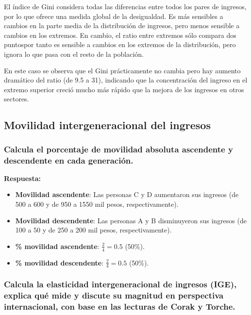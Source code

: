 \documentclass[
]{article}
\begin{document}
El índice de Gini considera todas las diferencias entre todos los pares
de ingresos, por lo que ofrece una medida global de la desigualdad. Es
más sensibles a cambios en la parte media de la distribución de
ingresos, pero menos sensible a cambios en los extremos. En cambio, el
ratio entre extremos sólo compara dos puntospor tanto es sensible a
cambios en los extremos de la distribución, pero ignora lo que pasa con
el resto de la población.

En este caso se observa que el Gini prácticamente no cambia pero hay
aumento dramático del ratio (de 9.5 a 31), indicando que la
concentración del ingreso en el extremo superior creció mucho más rápido
que la mejora de los ingresos en otros sectores.

\subsection{Movilidad intergeneracional del
ingresos}\label{movilidad-intergeneracional-del-ingresos}

\subsubsection{Calcula el porcentaje de movilidad absoluta ascendente y
descendente en cada
generación.}\label{calcula-el-porcentaje-de-movilidad-absoluta-ascendente-y-descendente-en-cada-generaciuxf3n.}

\textbf{Respuesta:}

\begin{itemize}
\item
  \textbf{Movilidad ascendente}: Las personas C y D aumentaron sus
  ingresos (de 500 a 600 y de 950 a 1550 mil pesos, respectivamente).
\item
  \textbf{Movilidad descendente}: Las personas A y B disminuyeron sus
  ingresos (de 100 a 50 y de 250 a 200 mil pesos, respectivamente).
\item
  \textbf{\% movilidad ascendente}: \(\frac{2}{4} = 0.5\) (50\%).
\item
  \textbf{\% movilidad descendente}: \(\frac{2}{4} = 0.5\) (50\%).
\end{itemize}

\subsubsection{Calcula la elasticidad intergeneracional de ingresos
(IGE), explica qué mide y discute su magnitud en perspectiva
internacional, con base en las lecturas de Corak y
Torche.}\label{calcula-la-elasticidad-intergeneracional-de-ingresos-ige-explica-quuxe9-mide-y-discute-su-magnitud-en-perspectiva-internacional-con-base-en-las-lecturas-de-corak-y-torche.}
\end{document}
